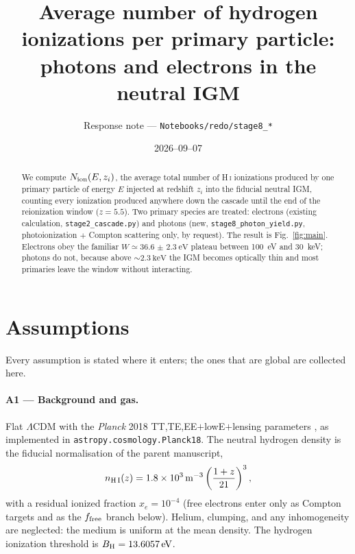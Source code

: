 \documentclass[11pt,a4paper]{article}
\title{Average number of hydrogen ionizations per primary particle:\\
photons and electrons in the neutral IGM}
\author{Response note --- \texttt{Notebooks/redo/stage8\_*}}
\date{2026--09--07}
\begin{document}
\maketitle

\begin{abstract}
\noindent
We compute $N_{\rm ion}(E,z_i)$, the average total number of H\,\textsc{i}
ionizations produced by one primary particle of energy $E$ injected at
redshift $z_i$ into the fiducial neutral IGM, counting every ionization
produced anywhere down the cascade until the end of the reionization window
($z=5.5$). Two primary species are treated: electrons (existing calculation,
\texttt{stage2\_cascade.py}) and photons (new, \texttt{stage8\_photon\_yield.py},
photoionization $+$ Compton scattering only, by request). The result is
Fig.~\ref{fig:main}. Electrons obey the familiar $W\simeq\SI{36.6(23)}{\electronvolt}$
plateau between \SI{100}{\electronvolt} and \SI{30}{\kilo\electronvolt};
photons do not, because above $\sim\SI{2.3}{\kilo\electronvolt}$ the IGM
becomes optically thin and most primaries leave the window without
interacting.
\end{abstract}

\section{Assumptions}

Every assumption is stated where it enters; the ones that are global are
collected here.

\paragraph{A1 --- Background and gas.}
Flat $\Lambda$CDM with the \emph{Planck} 2018 TT,TE,EE$+$lowE$+$lensing
parameters \citep{planck18}, as implemented in
\texttt{astropy.cosmology.Planck18}. The neutral hydrogen density is the
fiducial normalisation of the parent manuscript,
\begin{equation}
  n_{\rm H\,I}(z) = \SI{1.8e3}{\per\cubic\metre}
  \left(\frac{1+z}{21}\right)^{3},
  \label{eq:nHI}
\end{equation}
with a residual ionized fraction $x_e = 10^{-4}$ (free electrons enter only
as Compton targets and as the $f_{\rm free}$ branch below). Helium, clumping,
and any inhomogeneity are neglected: the medium is uniform at the mean
density. The hydrogen ionization threshold is $B_{\rm H}=\SI{13.6057}{\electronvolt}$.
\end{document}
